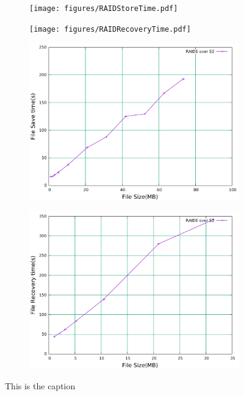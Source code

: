 
\begin{figure}
    \begin{subfigure}[b]{0.3\linewidth}
		\texttt{[image: figures/RAIDStoreTime.pdf]}
		\centering
		\caption{}
		\label{fig:R6Str}
	\end{subfigure}
	\hspace{0.01\textwidth}
	\begin{subfigure}[b]{0.3\linewidth}
		\texttt{[image: figures/RAIDRecoveryTime.pdf]}
		\centering
		\caption{}
		\label{fig:R6Rcv}
	\end{subfigure}
	\begin{subfigure}[b]{0.3\linewidth}
		\includegraphics[width=\linewidth]{figures/S3RAIDStoreTime.pdf}
		\centering
		\caption{}
		\label{fig:S3R6Str}
	\end{subfigure}
	\hspace{0.01\textwidth}
	\begin{subfigure}[b]{0.32\linewidth}
        \includegraphics[width=\linewidth]{figures/S3RAIDRecoveryTime.pdf}
		\centering
		\caption{}
		\label{fig:S3R6Rcv}
              \end{subfigure}
             \vspace{-0.9em}
	\caption{This is the caption}
	\label{fig:emulated}
	\vspace{-1em}
\end{figure}